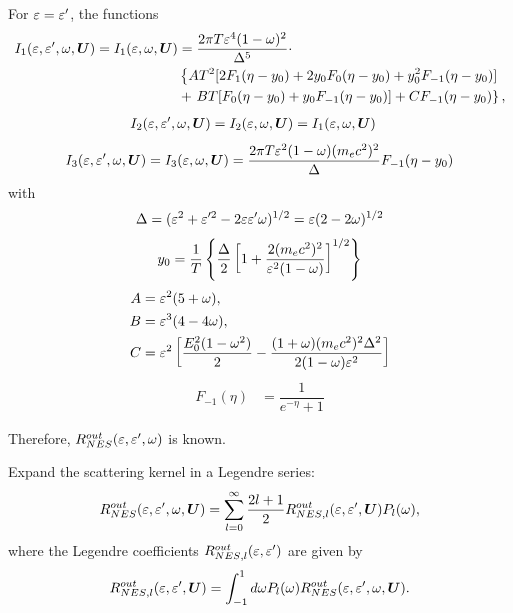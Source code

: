 \documentclass[10pt,preprint]{aastex}
\begin{document}
For $\varepsilon = \varepsilon^\prime$, the functions
\begin{align}
I_1(\varepsilon, \varepsilon^\prime, \omega, \boldsymbol{U}) = I_1(\varepsilon, \omega, \boldsymbol{U}) &= \dfrac{2\pi T \varepsilon^4 (1-\omega)^2}{\Delta^5}\cdot \\
& \left\lbrace  A T^2 [2F_1(\eta -y_0)+2y_0F_0(\eta-y_0)+y_0^2F_{-1}(\eta-y_0)] \right.\nonumber\\
& + \left. BT[F_0(\eta-y_0)+y_0F_{-1}(\eta-y_0)] + CF_{-1}(\eta-y_0)\right\rbrace,
\end{align}
\begin{align}
I_2(\varepsilon, \varepsilon^\prime, \omega, \boldsymbol{U})  = I_2(\varepsilon, \omega, \boldsymbol{U})&=I_1(\varepsilon, \omega, \boldsymbol{U}) 
\end{align}
\begin{align}
I_3(\varepsilon, \varepsilon^\prime, \omega,\boldsymbol{U})  = I_3(\varepsilon, \omega, \boldsymbol{U})=\dfrac{2\pi T \varepsilon^2(1-\omega)(m_ec^2)^2}{\Delta}F_{-1}(\eta - y_0)
\end{align}
with
\begin{align}
\Delta = (\varepsilon^2 + \varepsilon^{\prime 2} - 2\varepsilon \varepsilon^\prime
\omega)^{1/2} = \varepsilon(2 - 2\omega)^{1/2}
\end{align}
\begin{align}
y_0 = \dfrac{1}{T}\left\lbrace \dfrac{\Delta}{2} \left[1+\dfrac{2(m_e c^2)^2}{\varepsilon^2 (1-\omega)}\right]^{1/2} \right\rbrace 
\end{align}
\begin{align}
A &= \varepsilon ^2(5+\omega),\\
B &= \varepsilon^3 (4-4\omega),\\
C &= \varepsilon^2\left[\dfrac{E^{2}_0 (1-\omega^2)}{2} - \dfrac{(1+\omega)(m_e c^2)^2 \Delta^2}{2(1-\omega)\varepsilon^2} \right] 
\end{align}
\begin{align}
F_{-1} (\eta) &= \dfrac{1}{e^{-\eta} + 1} 
\end{align}

Therefore, $R^{out}_{NES}(\varepsilon,\varepsilon^\prime, \omega)$ is known. 
    
Expand the scattering kernel in a Legendre series:
\begin{align}
R^{out}_{NES}(\varepsilon,\varepsilon^\prime, \omega, \boldsymbol{U}) = \sum_{l=0}^{\infty} \dfrac{2l+1}{2} R^{out}_{{NES}, l}(\varepsilon,\varepsilon^\prime, \boldsymbol{U}) P_l(\omega),
\end{align}
where the Legendre coefficients $R^{out}_{{NES}, l}(\varepsilon,\varepsilon^\prime)$ are given by
\begin{align}
R^{out}_{{NES}, l}(\varepsilon,\varepsilon^\prime, \boldsymbol{U}) = \int_{-1}^{1} d\omega P_l(\omega) R^{out}_{NES}(\varepsilon,\varepsilon^\prime, \omega, \boldsymbol{U}).
\end{align}
   
\end{document}
